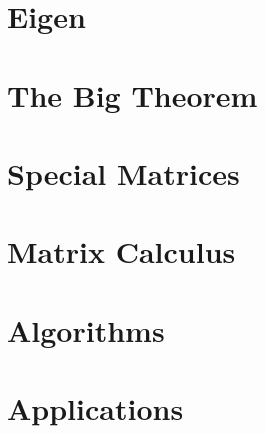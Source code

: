 \documentclass[11pt]{article}
\theoremstyle{definition}
\begin{document}
\section{Eigen}
\label{sec:eigen}



\section{The Big Theorem}
\label{sec:bigt}


\section{Special Matrices}
\label{sec:special}


\section{Matrix Calculus}
\label{sec:mcalc}


\section{Algorithms}
\label{sec:algorithms}


\section{Applications}
\label{sec:applications}

\end{document}
